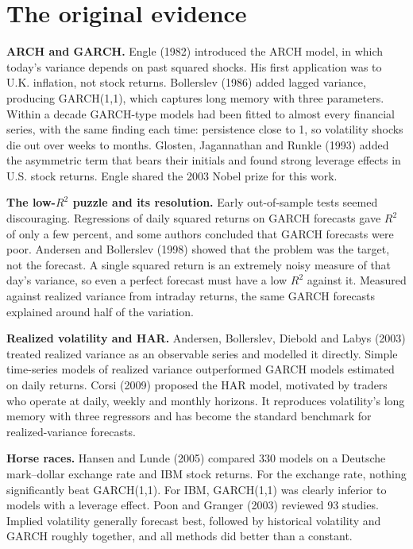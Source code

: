 \section{The original evidence}
\label{sec:14-evidence}

\textbf{ARCH and GARCH.} Engle (1982) introduced the ARCH model, in which today's variance depends on past squared shocks. His first application was to U.K. inflation, not stock returns. Bollerslev (1986) added lagged variance, producing GARCH(1,1), which captures long memory with three parameters. Within a decade GARCH-type models had been fitted to almost every financial series, with the same finding each time: persistence close to 1, so volatility shocks die out over weeks to months. Glosten, Jagannathan and Runkle (1993) added the asymmetric term that bears their initials and found strong leverage effects in U.S. stock returns. Engle shared the 2003 Nobel prize for this work.

\textbf{The low-$R^2$ puzzle and its resolution.} Early out-of-sample tests seemed discouraging. Regressions of daily squared returns on GARCH forecasts gave $R^2$ of only a few percent, and some authors concluded that GARCH forecasts were poor. Andersen and Bollerslev (1998) showed that the problem was the target, not the forecast. A single squared return is an extremely noisy measure of that day's variance, so even a perfect forecast must have a low $R^2$ against it. Measured against realized variance from intraday returns, the same GARCH forecasts explained around half of the variation.

\textbf{Realized volatility and HAR.} Andersen, Bollerslev, Diebold and Labys (2003) treated realized variance as an observable series and modelled it directly. Simple time-series models of realized variance outperformed GARCH models estimated on daily returns. Corsi (2009) proposed the HAR model, motivated by traders who operate at daily, weekly and monthly horizons. It reproduces volatility's long memory with three regressors and has become the standard benchmark for realized-variance forecasts.

\textbf{Horse races.} Hansen and Lunde (2005) compared 330 models on a Deutsche mark--dollar exchange rate and IBM stock returns. For the exchange rate, nothing significantly beat GARCH(1,1). For IBM, GARCH(1,1) was clearly inferior to models with a leverage effect. Poon and Granger (2003) reviewed 93 studies. Implied volatility generally forecast best, followed by historical volatility and GARCH roughly together, and all methods did better than a constant.

